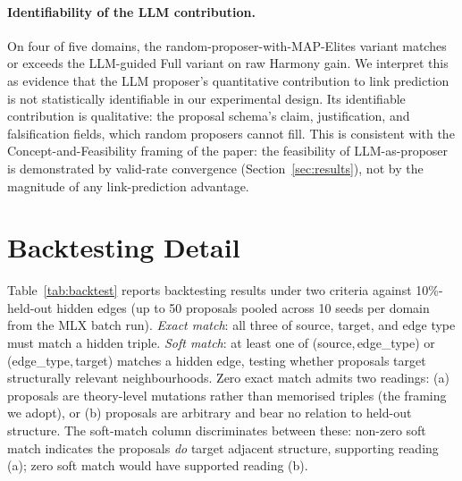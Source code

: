 \paragraph{Identifiability of the LLM contribution.}
On four of five domains, the random-proposer-with-MAP-Elites variant
matches or exceeds the LLM-guided Full variant on raw Harmony gain.
We interpret this as evidence that the LLM proposer's quantitative
contribution to link prediction is not statistically identifiable in
our experimental design.  Its identifiable contribution is qualitative:
the proposal schema's claim, justification, and falsification fields,
which random proposers cannot fill.  This is consistent with the
Concept-and-Feasibility framing of the paper: the feasibility of
LLM-as-proposer is demonstrated by valid-rate convergence
(Section~\ref{sec:results}), not by the magnitude of any
link-prediction advantage.

\section{Backtesting Detail}\label{app:backtesting}

Table~\ref{tab:backtest} reports backtesting results under two criteria against
10\%-held-out hidden edges (up to 50 proposals pooled across 10 seeds per domain from
the MLX batch run).  \emph{Exact match}: all three of source, target, and edge
type must match a hidden triple.  \emph{Soft match}: at least one of
(source,\,edge\_type) or (edge\_type,\,target) matches a hidden edge, testing
whether proposals target structurally relevant neighbourhoods.
Zero exact match admits two readings: (a) proposals are theory-level
mutations rather than memorised triples (the framing we adopt), or (b)
proposals are arbitrary and bear no relation to held-out structure.
The soft-match column discriminates between these: non-zero soft match
indicates the proposals \emph{do} target adjacent structure, supporting
reading (a); zero soft match would have supported reading (b).

